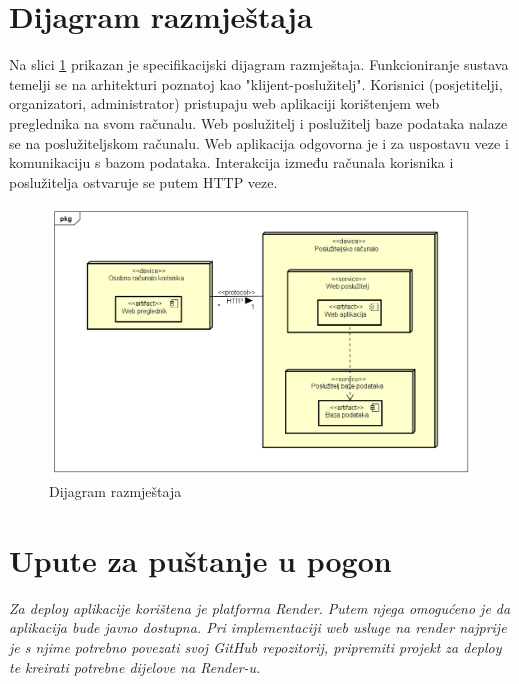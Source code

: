 			
			\eject 
		
		
		\section{Dijagram razmještaja}
		
			Na slici \ref{depd} prikazan je specifikacijski dijagram razmještaja. Funkcioniranje sustava temelji se na arhitekturi poznatoj kao "klijent-poslužitelj". Korisnici (posjetitelji, organizatori, administrator) pristupaju web aplikaciji korištenjem web preglednika na svom računalu. Web poslužitelj i poslužitelj baze podataka nalaze se na poslužiteljskom računalu. Web aplikacija odgovorna je i za uspostavu veze i komunikaciju s bazom podataka. Interakcija između računala korisnika i poslužitelja ostvaruje se putem HTTP veze.
			
			
			\begin{figure}[H]
				\includegraphics[width=\textwidth]{dijagrami/depd.png} 
				\centering
				\vspace{-0.2cm}
				\caption{Dijagram razmještaja}
				\label{depd}
			\end{figure}
			
			
			\eject 
		
		\section{Upute za puštanje u pogon}
		
			
			\textit{Za deploy aplikacije korištena je platforma Render. Putem njega omogućeno je da aplikacija bude javno dostupna. Pri implementaciji web usluge na render najprije je s njime potrebno povezati svoj GitHub repozitorij, pripremiti projekt za deploy te kreirati potrebne dijelove na Render-u.}
			

